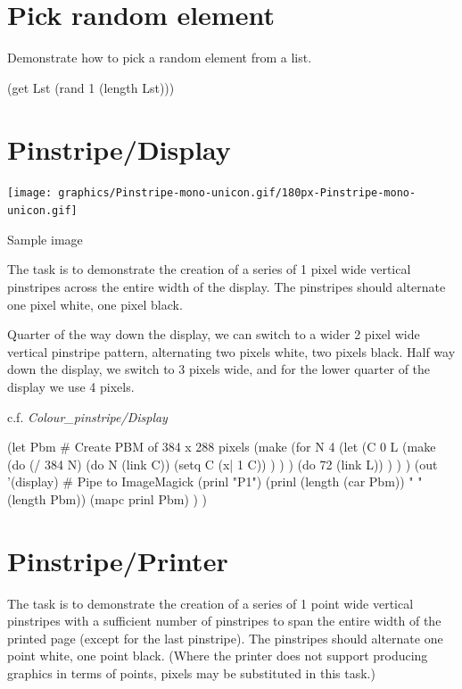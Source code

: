 \pagebreak{}
\section*{Pick random element}

Demonstrate how to pick a random element from a list.

\begin{wideverbatim}

(get Lst (rand 1 (length Lst)))

\end{wideverbatim}

\pagebreak{}
\section*{Pinstripe/Display}

\texttt{[image: graphics/Pinstripe-mono-unicon.gif/180px-Pinstripe-mono-unicon.gif]}

Sample image

The task is to demonstrate the creation of a series of 1 pixel wide
vertical pinstripes across the entire width of the display. The
pinstripes should alternate one pixel white, one pixel black.

Quarter of the way down the display, we can switch to a wider 2 pixel
wide vertical pinstripe pattern, alternating two pixels white, two
pixels black. Half way down the display, we switch to 3 pixels wide, and
for the lower quarter of the display we use 4 pixels.

c.f. \emph{Colour\_pinstripe/Display}

\begin{wideverbatim}

(let Pbm  # Create PBM of 384 x 288 pixels
   (make
      (for N 4
         (let
            (C 0
               L (make
                  (do (/ 384 N)
                     (do N (link C))
                     (setq C (x| 1 C)) ) ) )
            (do 72 (link L)) ) ) )
   (out '(display)  # Pipe to ImageMagick
      (prinl "P1")
      (prinl (length (car Pbm)) " " (length Pbm))
      (mapc prinl Pbm) ) )

\end{wideverbatim}

\pagebreak{}
\section*{Pinstripe/Printer}

The task is to demonstrate the creation of a series of 1 point wide
vertical pinstripes with a sufficient number of pinstripes to span the
entire width of the printed page (except for the last pinstripe). The
pinstripes should alternate one point white, one point black. (Where the
printer does not support producing graphics in terms of points, pixels
may be substituted in this task.)

